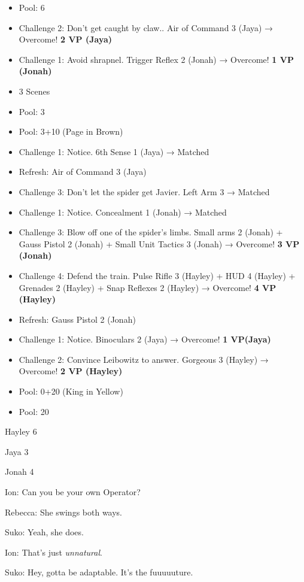 \begin{itemize}
\item Pool: 6
\item Challenge 2: Don't get caught by claw.. Air of Command 3 (Jaya) → Overcome! \textbf{2 VP (Jaya)}
\item Challenge 1: Avoid shrapnel. Trigger Reflex 2 (Jonah) → Overcome! \textbf{1 VP (Jonah)}
\item 3 Scenes
\item Pool: 3
\item Pool: 3+10 (Page in Brown)
\item Challenge 1: Notice.  6th Sense 1 (Jaya) → Matched
\item Refresh: Air of Command 3 (Jaya)
\item Challenge 3: Don't let the spider get Javier.  Left Arm 3  → Matched
\item Challenge 1: Notice.  Concealment 1 (Jonah) → Matched
\item Challenge 3: Blow off one of the spider's limbs.  Small arms 2 (Jonah) + Gauss Pistol 2 (Jonah) + Small Unit Tactics 3 (Jonah) → Overcome! \textbf{3 VP (Jonah)}
\item Challenge 4: Defend the train.  Pulse Rifle 3 (Hayley) + HUD 4 (Hayley) + Grenades 2 (Hayley) + Snap Reflexes 2 (Hayley) → Overcome! \textbf{4 VP (Hayley)}
\item Refresh: Gauss Pistol 2 (Jonah)
\item Challenge 1: Notice.  Binoculars 2 (Jaya) → Overcome! \textbf{1 VP(Jaya)}
\item Challenge 2: Convince Leibowitz to answer.  Gorgeous 3 (Hayley) → Overcome! \textbf{2 VP (Hayley)}
\item Pool: 0+20 (King in Yellow)
\item Pool: 20
\end{itemize}





Hayley 6

Jaya 3

Jonah 4



Ion: Can you be your own Operator?

Rebecca: She swings both ways.

Suko: Yeah, she does.

Ion: That's just \textit{unnatural}.

Suko: Hey, gotta be adaptable. It's the fuuuuuture.

